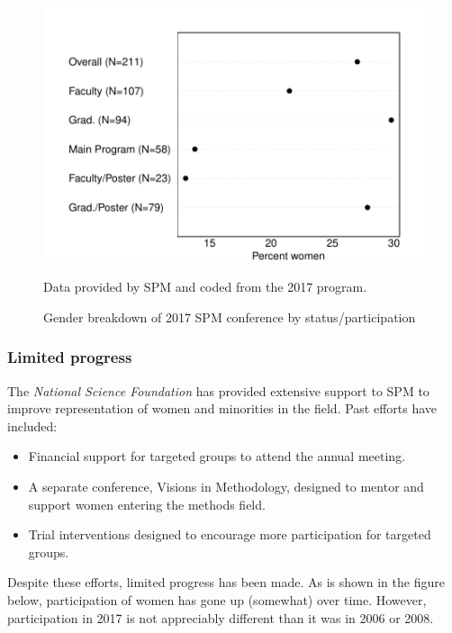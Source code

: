 \documentclass[12pt]{texMemo}
\begin{document}
\newpage

\begin{figure}[htbp]
\caption{Gender breakdown of 2017 SPM conference by status/participation }
\vspace{-.3in}
\begin{center}
\includegraphics[scale=.8]{polmeth}
\end{center}


\footnotesize Data provided by SPM and coded from the 2017 program.
\end{figure}


\subsubsection*{Limited progress}

The \textit{National Science Foundation} has provided extensive support to SPM to improve representation of women and minorities in the field.  Past efforts have included:
\begin{itemize}\setlength\itemsep{0em}
\item Financial support for targeted groups to attend the annual meeting.
\item A separate conference, Visions in Methodology, designed to mentor and support women entering the methods field.
\item Trial interventions designed to encourage more participation for targeted groups.
\end{itemize}
Despite these efforts, limited progress has been made.  As is shown in the figure below, participation of women has gone up (somewhat) over time. However, participation in 2017 is not appreciably different than it was in 2006 or 2008.
\end{document}
